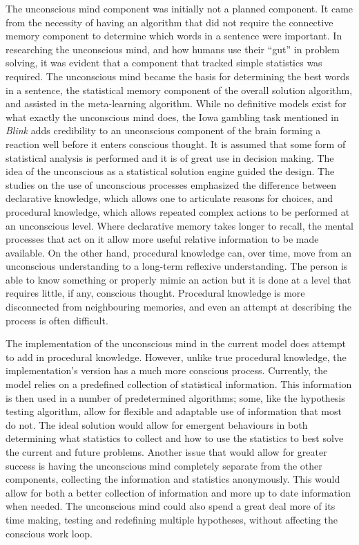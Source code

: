 The unconscious mind component was initially not a planned component.  It came
from the necessity of having an algorithm that did not require the connective
memory component to determine which words in a sentence were important. In
researching the unconscious mind, and how humans use their ``gut'' in problem
solving, it was evident that a component that tracked simple statistics was
required. The unconscious mind became the basis for determining the best words
in a sentence, the statistical memory component of the overall solution
algorithm, and assisted in the meta-learning algorithm.  While no definitive
models exist for what exactly the unconscious mind does, the Iowa gambling task
\cite{Bechara1, Bechara2} mentioned in {\it Blink} \cite{BLINK} adds credibility to an
unconscious component of the brain forming a reaction well before it enters
conscious thought. It is assumed that some form of statistical analysis is
performed and it is of great use in decision making.  The idea of the
unconscious as a statistical solution engine guided the design.  The studies on
the use of unconscious processes emphasized the difference between declarative
knowledge, which allows one to articulate reasons for choices, and procedural
knowledge, which allows repeated complex actions to be performed at an
unconscious level.  Where declarative memory takes longer to recall, the mental
processes that act on it allow more useful relative information to be made
available.  On the other hand, procedural knowledge can, over time, move from an 
unconscious understanding to a long-term reflexive understanding.  The person
is able to know something or properly mimic an action but it is done at a level
that requires little, if any, conscious thought.  Procedural knowledge is more
disconnected from neighbouring memories, and even an attempt at describing the
process is often difficult.

The implementation of the unconscious mind in the current model does attempt to
add in procedural knowledge.  However, unlike true procedural knowledge, the
implementation's version has a much more conscious process.  Currently, the model
relies on a predefined collection of statistical information.  This information is
then used in a number of predetermined algorithms; some, like the hypothesis
testing algorithm, allow for flexible and adaptable use of information that most do
not.  The ideal solution would allow for emergent behaviours in both determining
what statistics to collect and how to use the statistics to best solve the
current and future problems.  Another issue that would allow for greater success
is having the unconscious mind completely separate from the other components,
collecting the information and statistics anonymously. This would allow for both
a better collection of information and more up to date information when needed.
The unconscious mind could also spend a great deal more of its time making,
testing and redefining multiple hypotheses, without affecting the conscious work
loop.

